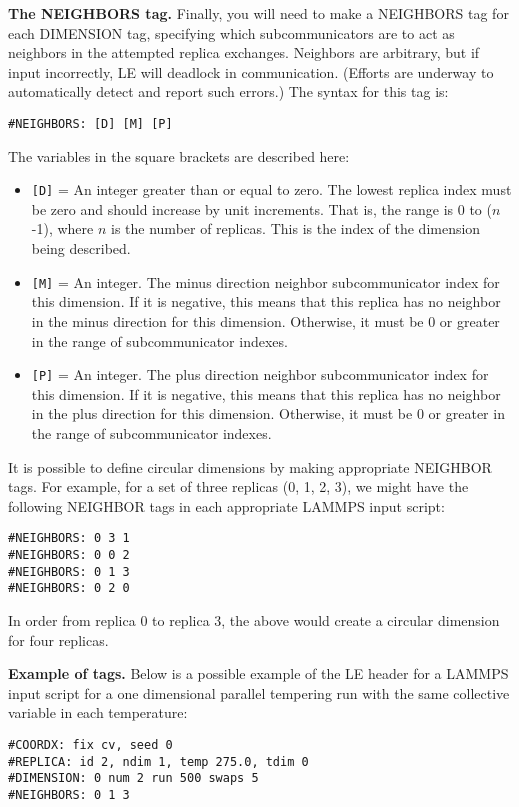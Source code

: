 \documentclass[10pt]{article}
\begin{document}
\textbf{The NEIGHBORS tag.}
Finally, you will need to make a NEIGHBORS tag for each DIMENSION tag, specifying which
subcommunicators are to act as neighbors in the attempted replica exchanges. Neighbors
are arbitrary, but if input incorrectly, LE will deadlock in communication. (Efforts
are underway to automatically detect and report such errors.) The syntax for this
tag is:
\begin{verbatim}
#NEIGHBORS: [D] [M] [P]
\end{verbatim}
The variables in the square brackets are described here:
\begin{itemize}
\item	\texttt{[D]} = An integer greater than or equal to zero. The lowest
		replica index must be zero and should increase by unit increments. That is,
		the range is 0 to ($n$-1), where $n$ is the number of replicas. This is
		the index of the dimension being described.
\item   \texttt{[M]} = An integer. The minus direction neighbor subcommunicator
		index for this dimension. If it is negative, this means that this 
		replica has no neighbor in the minus direction for this dimension. Otherwise,
		it must be 0 or greater in the range of subcommunicator indexes.
\item   \texttt{[P]} = An integer. The plus direction neighbor subcommunicator
		index for this dimension. If it is negative, this means that this 
		replica has no neighbor in the plus direction for this dimension. Otherwise,
		it must be 0 or greater in the range of subcommunicator indexes.
\end{itemize}

It is possible to define circular dimensions by making appropriate NEIGHBOR tags. For
example, for a set of three replicas (0, 1, 2, 3), we might have the following NEIGHBOR tags
in each appropriate LAMMPS input script:
\begin{verbatim}
#NEIGHBORS: 0 3 1
#NEIGHBORS: 0 0 2
#NEIGHBORS: 0 1 3
#NEIGHBORS: 0 2 0
\end{verbatim}
In order from replica 0 to replica 3, the above would create a circular dimension for four
replicas.


\textbf{Example of tags.}
Below is a possible example of the LE header for a LAMMPS input script for a one dimensional
parallel tempering run with the same collective variable in each temperature:
\begin{verbatim}
#COORDX: fix cv, seed 0
#REPLICA: id 2, ndim 1, temp 275.0, tdim 0
#DIMENSION: 0 num 2 run 500 swaps 5
#NEIGHBORS: 0 1 3
\end{verbatim}
\end{document}
